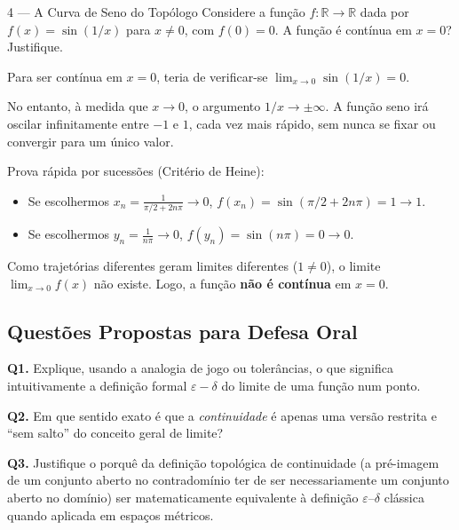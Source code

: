 \begin{exercisebox}{4 --- A Curva de Seno do Topólogo}
  Considere a função $f:\mathbb{R} \to \mathbb{R}$ dada por $f(x)=\sin(1/x)$ para $x\neq 0$, com $f(0)=0$. A função é contínua em $x=0$? Justifique.
\end{exercisebox}
\begin{solbox}
  Para ser contínua em $x=0$, teria de verificar-se $\lim_{x \to 0} \sin(1/x) = 0$.
  
  No entanto, à medida que $x \to 0$, o argumento $1/x \to \pm \infty$. A função seno irá oscilar infinitamente entre $-1$ e $1$, cada vez mais rápido, sem nunca se fixar ou convergir para um único valor.
  
  Prova rápida por sucessões (Critério de Heine):
  \begin{itemize}
      \item Se escolhermos $x_n = \frac{1}{\pi/2 + 2n\pi} \to 0$, $f(x_n) = \sin(\pi/2 + 2n\pi) = 1 \to 1$.
      \item Se escolhermos $y_n = \frac{1}{n\pi} \to 0$, $f(y_n) = \sin(n\pi) = 0 \to 0$.
  \end{itemize}
  Como trajetórias diferentes geram limites diferentes ($1 \neq 0$), o limite $\lim_{x \to 0} f(x)$ não existe. Logo, a função \textbf{não é contínua} em $x=0$.
\end{solbox}

\subsection{Questões Propostas para Defesa Oral}

\begin{oralbox}
  \textbf{Q1.} Explique, usando a analogia de jogo ou tolerâncias, o que significa intuitivamente a definição formal $\varepsilon-\delta$ do limite de uma função num ponto.
\end{oralbox}

\begin{oralbox}
  \textbf{Q2.} Em que sentido exato é que a \emph{continuidade} é apenas uma versão restrita e ``sem salto'' do conceito geral de limite?
\end{oralbox}

\begin{oralbox}
  \textbf{Q3.} Justifique o porquê da definição topológica de continuidade (a pré-imagem de um conjunto aberto no contradomínio ter de ser necessariamente um conjunto aberto no domínio) ser matematicamente equivalente à definição $\varepsilon$--$\delta$ clássica quando aplicada em espaços métricos.
\end{oralbox}

